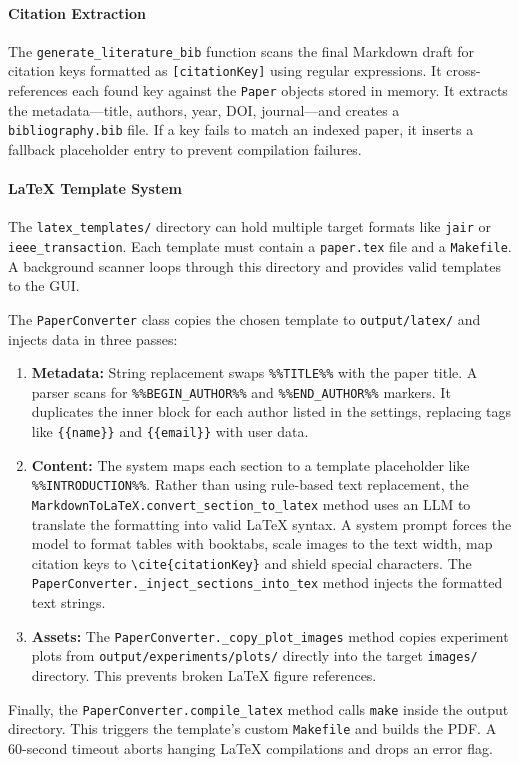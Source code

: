 \paragraph{Citation Extraction}
The \texttt{generate\_literature\_bib} function scans the final Markdown draft for citation keys formatted as \texttt{[citationKey]} using regular expressions.
It cross-references each found key against the \texttt{Paper} objects stored in memory.
It extracts the metadata---title, authors, year, DOI, journal---and creates a \texttt{bibliography.bib} file.
If a key fails to match an indexed paper, it inserts a fallback placeholder entry to prevent compilation failures.

\paragraph{\LaTeX{} Template System}
The \texttt{latex\_templates/} directory can hold multiple target formats like \texttt{jair} or \texttt{ieee\_transaction}.
Each template must contain a \texttt{paper.tex} file and a \texttt{Makefile}.
A background scanner loops through this directory and provides valid templates to the GUI.

The \texttt{PaperConverter} class copies the chosen template to \texttt{output/latex/} and injects data in three passes:

\begin{enumerate}[nosep]
	\item \textbf{Metadata:} String replacement swaps \texttt{\%\%TITLE\%\%} with the paper title. A parser scans for \texttt{\%\%BEGIN\_AUTHOR\%\%} and \texttt{\%\%END\_AUTHOR\%\%} markers. It duplicates the inner block for each author listed in the settings, replacing tags like \texttt{\{\{name\}\}} and \texttt{\{\{email\}\}} with user data.
	\item \textbf{Content:} The system maps each section to a template placeholder like \texttt{\%\%\allowbreak{}INTRODUCTION\allowbreak{}\%\%}. Rather than using rule-based text replacement, the \texttt{MarkdownToLaTeX.\allowbreak{}convert\_\allowbreak{}section\_\allowbreak{}to\_\allowbreak{}latex} method uses an LLM to translate the formatting into valid \LaTeX{} syntax. 
	A system prompt forces the model to format tables with booktabs, scale images to the text width, map citation keys to \texttt{\textbackslash cite\{citationKey\}} and shield special characters. 
	The \texttt{PaperConverter.\_inject\_sections\_into\_tex} method injects the formatted text strings.
	\item \textbf{Assets:} The \texttt{PaperConverter.\_copy\_plot\_images} method copies experiment plots from \texttt{output/experiments/plots/} directly into the target \texttt{images/} directory. This prevents broken \LaTeX{} figure references.
\end{enumerate}

Finally, the \texttt{PaperConverter.compile\_latex} method calls \texttt{make} inside the output directory.
This triggers the template's custom \texttt{Makefile} and builds the PDF.
A 60-second timeout aborts hanging \LaTeX{} compilations and drops an error flag.